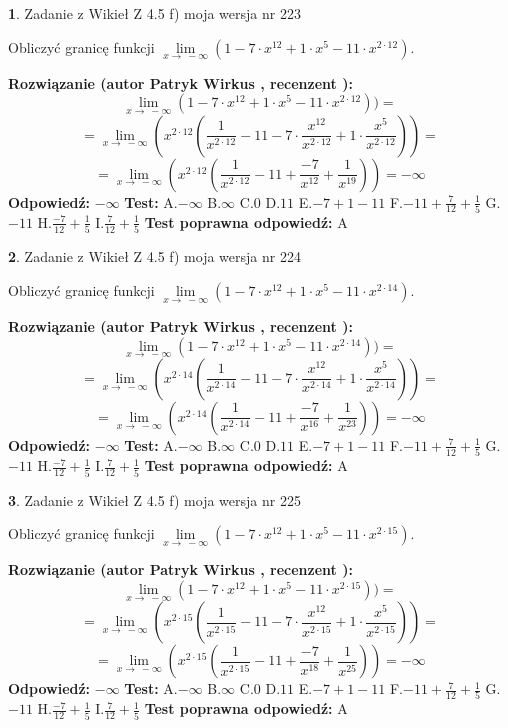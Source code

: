 \documentclass[12pt, a4paper]{article}
\theoremstyle{definition} %
\newtheorem{zad}{}
\newcommand{\zadStart}[1]{\begin{zad}#1\newline}
\newcommand{\zadStop}{\end{zad}}
\newcommand{\rozwStart}[2]{\noindent \textbf{Rozwiązanie (autor #1 , recenzent #2): }\newline}
\newcommand{\rozwStop}{\newline}
\newcommand{\odpStart}{\noindent \textbf{Odpowiedź:}\newline}
\newcommand{\odpStop}{\newline}
\newcommand{\testStart}{\noindent \textbf{Test:}\newline}
\newcommand{\testStop}{\newline}
\newcommand{\kluczStart}{\noindent \textbf{Test poprawna odpowiedź:}\newline}
\newcommand{\kluczStop}{\newline}
\begin{document}
\zadStart{Zadanie z Wikieł Z 4.5 f) moja wersja nr 223}



Obliczyć granicę funkcji  $\lim\limits_{x\to\ -\infty}(1 - 7 \cdot x^{12}+1 \cdot x^{5}- 11 \cdot x^{2\cdot12})$.
\zadStop
\rozwStart{Patryk Wirkus}{}
$$\lim\limits_{x\to\ -\infty}(1 - 7 \cdot x^{12}+1 \cdot x^{5}- 11 \cdot x^{2\cdot12}))=$$
$$=\lim\limits_{x\to\ -\infty}(x^{2\cdot12}(\frac{1}{x^{2\cdot12}}-11 -7 \cdot \frac{x^{12}}{x^{2\cdot12}}+1 \cdot \frac{x^{5}}{x^{2\cdot12}}))=$$
$$=\lim\limits_{x\to\ -\infty}(x^{2\cdot12}(\frac{1}{x^{2\cdot12}}-11 + \frac{-7}{x^{12}}+ \frac{1}{x^{19}}))=-\infty$$
\rozwStop
\odpStart
$-\infty$
\odpStop
\testStart
A.$-\infty$ B.$\infty$ C.$0$ D.$11$ E.$-7 + 1 - 11$
F.$-11+\frac{7}{12}+\frac{1}{5}$ G.$-11$
H.$\frac{-7}{12}+\frac{1}{5}$
I.$\frac{7}{12}+\frac{1}{5}$
\testStop
\kluczStart
A
\kluczStop



\zadStart{Zadanie z Wikieł Z 4.5 f) moja wersja nr 224}



Obliczyć granicę funkcji  $\lim\limits_{x\to\ -\infty}(1 - 7 \cdot x^{12}+1 \cdot x^{5}- 11 \cdot x^{2\cdot14})$.
\zadStop
\rozwStart{Patryk Wirkus}{}
$$\lim\limits_{x\to\ -\infty}(1 - 7 \cdot x^{12}+1 \cdot x^{5}- 11 \cdot x^{2\cdot14}))=$$
$$=\lim\limits_{x\to\ -\infty}(x^{2\cdot14}(\frac{1}{x^{2\cdot14}}-11 -7 \cdot \frac{x^{12}}{x^{2\cdot14}}+1 \cdot \frac{x^{5}}{x^{2\cdot14}}))=$$
$$=\lim\limits_{x\to\ -\infty}(x^{2\cdot14}(\frac{1}{x^{2\cdot14}}-11 + \frac{-7}{x^{16}}+ \frac{1}{x^{23}}))=-\infty$$
\rozwStop
\odpStart
$-\infty$
\odpStop
\testStart
A.$-\infty$ B.$\infty$ C.$0$ D.$11$ E.$-7 + 1 - 11$
F.$-11+\frac{7}{12}+\frac{1}{5}$ G.$-11$
H.$\frac{-7}{12}+\frac{1}{5}$
I.$\frac{7}{12}+\frac{1}{5}$
\testStop
\kluczStart
A
\kluczStop



\zadStart{Zadanie z Wikieł Z 4.5 f) moja wersja nr 225}



Obliczyć granicę funkcji  $\lim\limits_{x\to\ -\infty}(1 - 7 \cdot x^{12}+1 \cdot x^{5}- 11 \cdot x^{2\cdot15})$.
\zadStop
\rozwStart{Patryk Wirkus}{}
$$\lim\limits_{x\to\ -\infty}(1 - 7 \cdot x^{12}+1 \cdot x^{5}- 11 \cdot x^{2\cdot15}))=$$
$$=\lim\limits_{x\to\ -\infty}(x^{2\cdot15}(\frac{1}{x^{2\cdot15}}-11 -7 \cdot \frac{x^{12}}{x^{2\cdot15}}+1 \cdot \frac{x^{5}}{x^{2\cdot15}}))=$$
$$=\lim\limits_{x\to\ -\infty}(x^{2\cdot15}(\frac{1}{x^{2\cdot15}}-11 + \frac{-7}{x^{18}}+ \frac{1}{x^{25}}))=-\infty$$
\rozwStop
\odpStart
$-\infty$
\odpStop
\testStart
A.$-\infty$ B.$\infty$ C.$0$ D.$11$ E.$-7 + 1 - 11$
F.$-11+\frac{7}{12}+\frac{1}{5}$ G.$-11$
H.$\frac{-7}{12}+\frac{1}{5}$
I.$\frac{7}{12}+\frac{1}{5}$
\testStop
\kluczStart
A
\kluczStop
\end{document}
